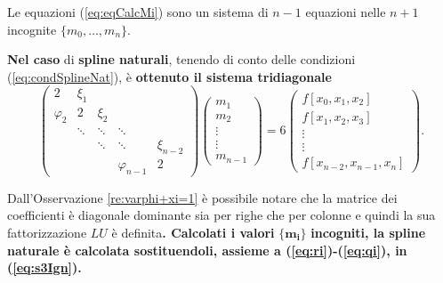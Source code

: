 Le equazioni (\ref{eq:eqCalcMi}) sono un sistema di $n-1$ equazioni nelle $n+1$ incognite $\{m_0,\hdots,m_n\}$.

\textbf{Nel caso} di \textbf{spline naturali}, tenendo di conto delle condizioni (\ref{eq:condSplineNat}), è \textbf{ottenuto il sistema tridiagonale} 
\begin{equation*}
    \begin{pmatrix}
        2 & \xi_1 & && \\
        \varphi_2 & 2 & \xi_2&&\\
        &\ddots & \ddots &\ddots&\\
        &&\ddots & \ddots &\xi_{n-2}\\
        &&&\varphi_{n-1} & 2
    \end{pmatrix}\begin{pmatrix}
        m_1\\
        m_2\\
        \vdots\\
        \vdots\\
        m_{n-1}
    \end{pmatrix}=6\begin{pmatrix}
        f[x_0,x_1,x_2]\\
        f[x_1,x_2,x_3]\\
        \vdots\\
        \vdots\\
        f[x_{n-2},x_{n-1},x_n]
    \end{pmatrix}.
\end{equation*}

Dall'Osservazione \ref{re:varphi+xi=1} è possibile notare che la matrice dei coefficienti è diagonale dominante sia per righe che per colonne e quindi la sua fattorizzazione $LU$ è definita\textbf{. Calcolati i valori} $\boldsymbol{\{m_i\}}$ \textbf{incogniti, la spline naturale è calcolata sostituendoli, assieme a (\ref{eq:ri})-(\ref{eq:qi}), in (\ref{eq:s3Ign}).}

